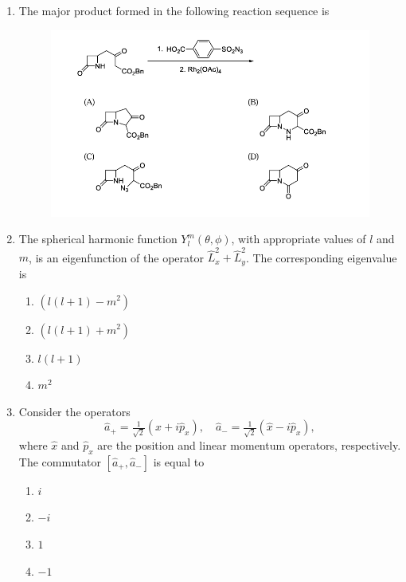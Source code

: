 \documentclass{article}
\begin{document}
\begin{enumerate}
\item The major product formed in the following reaction sequence is
\begin{figure}[H]
    \centering
    \includegraphics[width=1\columnwidth]{figures/cy_q6.png}
    \label{fig:placeholder}
\end{figure}

\item The spherical harmonic function $Y_l^m(\theta,\phi)$, with appropriate values of $l$ and $m$, 
is an eigenfunction of the operator $\hat{L}_x^2 + \hat{L}_y^2$. 
The corresponding eigenvalue is
\begin{multicols}{4}
\begin{enumerate}
    \item $(l(l+1) - m^2)$
    \item $(l(l+1) + m^2)$
    \item $l(l+1)$
    \item $m^2$
\end{enumerate}
\end{multicols}

\item Consider the operators
\[
\hat{a}_+ = \tfrac{1}{\sqrt{2}}\left(\hat{x} + i\hat{p}_x\right), 
\quad 
\hat{a}_- = \tfrac{1}{\sqrt{2}}\left(\hat{x} - i\hat{p}_x\right),
\]
where $\hat{x}$ and $\hat{p}_x$ are the position and linear momentum operators, respectively.  
The commutator $[\hat{a}_+,\hat{a}_-]$ is equal to
\begin{multicols}{2}
\begin{enumerate}
    \item $i$
    \item $-i$
    \item $1$
    \item $-1$
\end{enumerate}
\end{multicols}


\end{enumerate}
\end{document}
